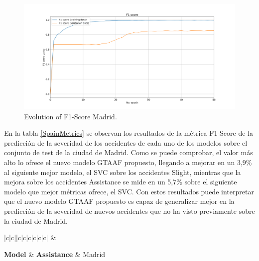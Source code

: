\documentclass{uathesis-es}
\begin{document}
{	
	\begin{figure}[H]
		\centering
		\includegraphics[width=160mm]{Figures/Madrid/madrid_convolution_2d_f1_score_2023-12-03-12 54 29.png}
		\caption{Evolution of F1-Score Madrid.}
		\label{MadridLossFunction}
	\end{figure}
	
	En la tabla \ref{SpainMetrics} se observan los resultados de la métrica F1-Score de la predicción de la severidad de los accidentes de cada uno de los modelos sobre el conjunto de test de la ciudad de Madrid. Como se puede comprobar, el valor más alto lo ofrece el nuevo modelo GTAAF propuesto, llegando a mejorar en un 3,9\% al siguiente mejor modelo, el SVC sobre los accidentes Slight, mientras que la mejora sobre los accidentes Assistance se mide en un 5,7\% sobre el siguiente modelo que mejor métricas ofrece, el SVC. Con estos resultados puede interpretar que el nuevo modelo GTAAF propuesto es capaz de generalizar mejor en la predicción de la severidad de nuevos accidentes que no ha visto previamente sobre la ciudad de Madrid.
	
	\begin{table}[H]
		\begin{center}
			\begin{tabular}{|c|c||c|c|c|c|c|c|}
				\hline
				 &
				 \\ \hline
				
				\textbf{Model} & \textbf{Assistance} & Madrid
				\\ \hline \hline
				

\end{tabular}
\end{center}
\end{table}}
\end{document}
